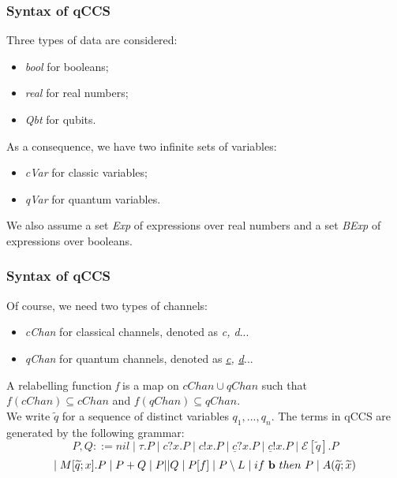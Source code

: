 \documentclass{beamer}
\begin{document}
\begin{frame}
\frametitle{Syntax of qCCS}
Three types of data are considered:
	\begin{itemize}
		\item \emph{bool} for booleans;
		\item \emph{real} for real numbers;
		\item \emph{Qbt} for qubits.
	\end{itemize}
As a consequence, we have two infinite sets of variables:
	\begin{itemize}
		\item \emph{cVar} for classic variables;
		\item \emph{qVar} for quantum variables.
	\end{itemize}
We also assume a set \emph{Exp} of expressions over real numbers and a set \emph{BExp} of expressions over booleans.
\end{frame}

\begin{frame}
\frametitle{Syntax of qCCS}
Of course, we need two types of channels:
	\begin{itemize}
		\item \emph{cChan} for classical channels, denoted as \emph{c, d}...
		\item \emph{qChan} for quantum channels, denoted as \emph{\underline{c}, \underline{d}}... 
	\end{itemize}
A relabelling function \emph{f} is a map on $cChan \cup qChan$ such that $f(cChan) \subseteq cChan$ and $f(qChan) \subseteq qChan$. \\
We write $\widetilde{q}$ for a sequence of distinct variables $q_1,...,q_n$.
The terms in qCCS are generated by the following grammar: \\
	\[ P, Q ::= nil \mid \tau.P \mid c?x.P \mid c!x.P \mid \underline{c}?x.P \mid \underline{c}!x.P \mid \mathcal{E}[\widetilde{q}].P \]
	\[ \mid M[\widetilde{q};x].P \mid P + Q \mid P \lvert \rvert Q \mid P[f] \mid P \setminus L \mid if \ \bold{b} \ then \ P \mid A(\widetilde{q}; \widetilde{x}) \]
\end{frame}
\end{document}
